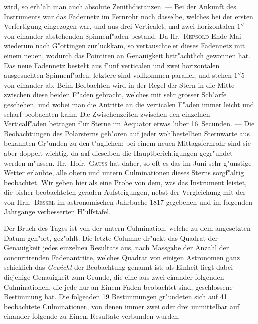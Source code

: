 \documentclass[12pt,a4paper]{article}
\begin{document}
wird, so erh"alt man auch absolute Zenithdistanzen. --- Bei der Ankunft des Instruments war das Fadennetz
im Fernrohr noch dasselbe, welches bei der ersten Verfertigung eingezogen war, und aus drei Verticalet,
und zwei horizontalen $1''$ von einander abstehenden Spinnenf"aden bestand. Da Hr.~\textsc{Repsold} Ende
Mai wiederum nach G"ottingen zur"uckkam, so vertauschte er dieses Fadennetz mit einem neuen, wodurch
das Pointiren an Genauigkeit betr"achtlich gewonnen hat. Das neue Fadennetz besteht aus f"unf verticalen
und zwei horizontalen ausgesuchten Spinnenf"aden; letztere sind vollkommen parallel, und stehen $1''5$
von einander ab. Beim Beobachten wird in der Regel der Stern in die Mitte zwischen diese beiden
F"aden gebracht, welches mit sehr grosser Sch"arfe geschehen, und wobei man die Antritte an die verticalen
F"aden immer leicht und scharf beobachten kann. Die Zwischenzeiten zwischen den einzelnen Verticalf"aden
betragen f"ur Sterne im Aequator etwas "uber 16~Secunden. --- Die Beobachtungen des Polarsterns
geh"oren auf jeder wohlbestellten Sternwarte aus bekannten Gr"unden zu den t"aglichen; bei einem neuen
Mittagsfernrohr sind sie aber doppelt wichtig, da auf dieselben die Hauptberichtigungen gegr"undet werden
m"ussen. Hr.~Hofr.~\textsc{Gauss} hat daher, so oft es das im Juni sehr g"unstige Wetter erlaubte, alle obern
und untern Culminationen dieses Sterns sorgf"altig beobachtet. Wir geben hier als eine Probe von dem,
was das Instrument leistet, die bisher beobachteten geraden Aufsteigungen, nebst der Vergleichung mit der
von Hrn.~\textsc{Bessel} im astronomischen Jahrbuche 1817 gegebenen und im folgenden Jahrgange verbesserten
H"ulfstafel.

\newpage

Der Bruch des Tages ist von der untern Culmination, welche zu dem angesetzten Datum geh"ort,
gez"ahlt. Die letzte Columne dr"uckt das Quadrat der Genauigkeit jedes einzelnen Resultats aus, nach
Massgabe der Anzahl der concurrirenden Fadenantritte, welches Quadrat von einigen Astronomen ganz
schicklich das \textit{Gewicht} der Beobachtung genannt ist; als Einheit liegt dabei diejenige Genauigkeit zum
Grunde, die eine aus zwei einander folgenden Culminationen, die jede nur an Einem Faden beobachtet
sind, geschlossene Bestimmung hat. Die folgenden 19 Bestimmungen gr"undeten sich auf 41 beobachtete
Culminationen, von denen immer zwei oder drei unmittelbar auf einander folgende zu Einem Resultate
verbunden wurden.
\end{document}
